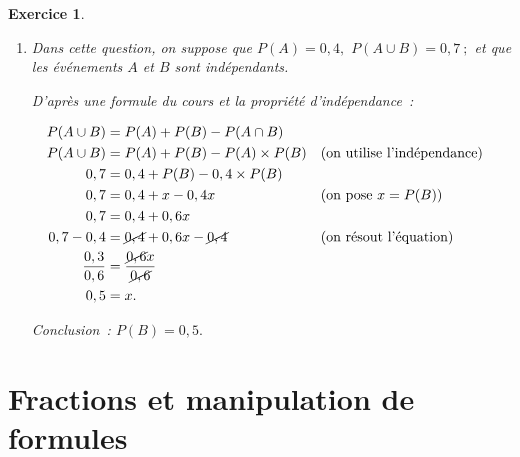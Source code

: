 \documentclass[10pt]{article}
\newtheorem{exo}{Exercice}
\begin{document}
\begin{exo}
\begin{enumerate}
\begin{enumerate}
\end{enumerate}
\item Dans cette question, on suppose que $P(A)=0,4,$ $P(A\cup B)=0,7~;$ et que les événements $A$ et $B$ sont indépendants.

\medskip

D'après une formule du cours et la propriété d'indépendance~:

\begin{align*}
P(A\cup B)&=P(A)+P(B)-P(A\cap B)\\
P(A\cup B)&=P(A)+P(B)-P(A)\times P(B)&&(\text{on utilise l'indépendance})\\
0,7&=0,4+P(B)-0,4 \times P(B)\\
0,7&=0,4+x-0,4 x&&(\text{on pose }x=P(B))\\
0,7&=0,4+0,6 x\\
0,7-0,4&=\cancel{0,4}+0,6x-\cancel{0,4}&&(\text{on résout l'équation})\\
\frac{0,3}{0,6}&=\frac{\cancel{0,6}x}{\cancel{0,6}}\\
0,5&=x.\end{align*}

Conclusion~: $P(B)=0,5.$

\end{enumerate}

\end{exo}

\setcounter{section}{14}
\section{Fractions et manipulation de formules}


\setcounter{exo}{173}
\end{document}
